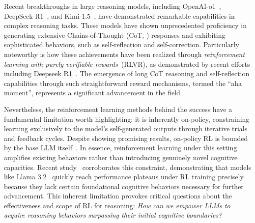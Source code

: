 \documentclass{article}
\begin{document}
Recent breakthroughs in large reasoning models, including OpenAI-o1~\cite{o1}, DeepSeek-R1~\cite{r1}, and Kimi-1.5~\cite{kimik1.5}, have demonstrated remarkable capabilities in complex reasoning tasks. These models have shown unprecedented proficiency in generating extensive Chains-of-Thought (CoT, \cite{cot}) responses and exhibiting sophisticated behaviors, such as self-reflection and self-correction. Particularly noteworthy is how these achievements have been realized through \textit{reinforcement learning with purely verifiable rewards}~(RLVR), as demonstrated by recent efforts including Deepseek R1~\cite{r1,simplerl,drgrpo,orz}. 
The emergence of long CoT reasoning and self-reflection capabilities through such straightforward reward mechanisms, termed the ``aha moment'', represents a significant advancement in the field. 



Nevertheless, the reinforcement learning methods behind the success have a fundamental limitation worth highlighting: 
it is inherently on-policy, constraining learning exclusively to the model’s self-generated outputs through iterative trials and feedback cycles.
Despite showing promising results, on-policy RL is bounded by the base LLM itself~\cite{zhao2025echochamberrlposttraining,rl_limits}. 
In essence, reinforcement learning under this setting amplifies existing behaviors rather than introducing genuinely novel cognitive capacities. 
Recent study~\cite{gandhi2025cognitivebehaviorsenableselfimproving} corroborates this constraint, demonstrating that models like Llama 3.2~\cite{llama32} quickly reach performance plateaus under RL training precisely because they lack certain foundational cognitive behaviors necessary for further advancement.
This inherent limitation provokes critical questions about the effectiveness and scope of RL for reasoning: 
\textit{How can we empower LLMs to acquire reasoning behaviors surpassing their initial cognitive boundaries?}
\end{document}
